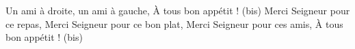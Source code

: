 \beginverse*
Un ami à droite, un ami à gauche,
À tous bon appétit ! (bis)
\endverse
\beginverse*
Merci Seigneur pour ce repas,
Merci Seigneur pour ce bon plat,
Merci Seigneur pour ces amis,
À tous bon appétit ! (bis)
\endverse
\endsong

